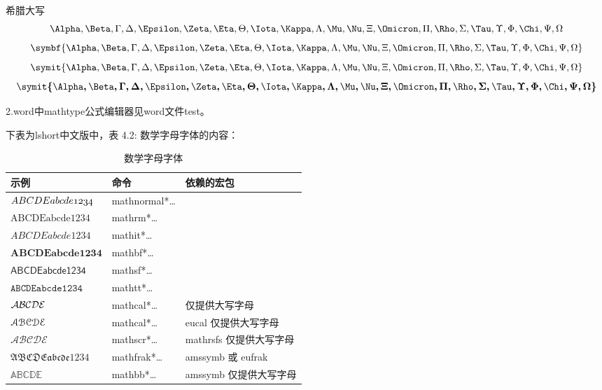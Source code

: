 \documentclass{article}
\begin{document}
希腊大写
\begin{equation}
  \Alpha, \Beta, \Gamma, \Delta, \Epsilon, \Zeta, \Eta, \Theta, \Iota, \Kappa, \Lambda, \Mu, \Nu, \Xi, \Omicron, \Pi, \Rho, \Sigma, \Tau, \Upsilon, \Phi, \Chi, \Psi, \Omega
\end{equation}
\begin{equation}
  \symbf{\Alpha, \Beta, \Gamma, \Delta, \Epsilon, \Zeta, \Eta, \Theta, \Iota, \Kappa, \Lambda, \Mu, \Nu, \Xi, \Omicron, \Pi, \Rho, \Sigma, \Tau, \Upsilon, \Phi, \Chi, \Psi, \Omega}
\end{equation}
\begin{equation}
  \symit{\Alpha, \Beta, \Gamma, \Delta, \Epsilon, \Zeta, \Eta, \Theta, \Iota, \Kappa, \Lambda, \Mu, \Nu, \Xi, \Omicron, \Pi, \Rho, \Sigma, \Tau, \Upsilon, \Phi, \Chi, \Psi, \Omega}
\end{equation}
\begin{equation}
  \boldsymbol{\symit{\Alpha, \Beta, \Gamma, \Delta, \Epsilon, \Zeta, \Eta, \Theta, \Iota, \Kappa, \Lambda, \Mu, \Nu, \Xi, \Omicron, \Pi, \Rho, \Sigma, \Tau, \Upsilon, \Phi, \Chi, \Psi, \Omega}} %
\end{equation}

2.word中mathtype公式编辑器见word文件test。


下表为lshort中文版中，表 4.2: 数学字母字体的内容：
\begin{table}[htp]
  \centering
  \caption{数学字母字体} \label{tbl:math-fonts}
  \begin{tabular}{*{3}{l}}
  \hline
  \textbf{示例}    & \textbf{命令} & \textbf{依赖的宏包}\\
  \hline
  $\mathnormal{ABCDE abcde 1234}$  & {mathnormal}*{\ldots}&       \\
  $\mathrm{ABCDE abcde 1234}$      & {mathrm}*{\ldots}    &       \\
  $\mathit{ABCDE abcde 1234}$      & {mathit}*{\ldots}    &       \\
  $\mathbf{ABCDE abcde 1234}$      & {mathbf}*{\ldots}    &       \\
  $\mathsf{ABCDE abcde 1234}$      & {mathsf}*{\ldots}    &       \\
  $\mathtt{ABCDE abcde 1234}$      & {mathtt}*{\ldots}    &       \\
  $\CMcal{ABCDE}$                  & {mathcal}*{\ldots}   & 仅提供大写字母 \\
  \hline
  $\EuScript{ABCDE}$               & {mathcal}*{\ldots}   & {eucal} 仅提供大写字母 \\
  $\mathscr{ABCDE}$                & {mathscr}*{\ldots}   & {mathrsfs} 仅提供大写字母\\
  $\mathfrak{ABCDE abcde 1234}$    & {mathfrak}*{\ldots}  & {amssymb} 或 {eufrak}  \\
  $\mathbb{ABCDE}$                 & {mathbb}*{\ldots}    & {amssymb} 仅提供大写字母 \\
  \hline
  \end{tabular}
  \end{table}
\end{document}
